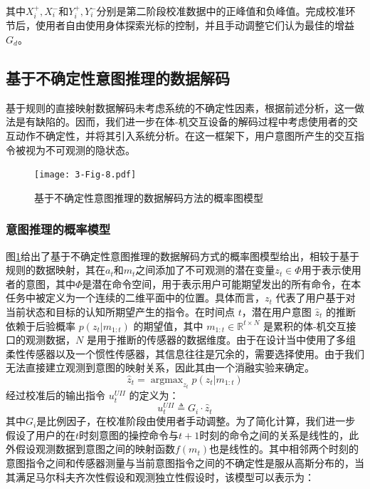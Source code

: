 其中$X_i^ + ,X_i^ - $和$Y_i^ + ,Y_i^ - $分别是第二阶段校准数据中的正峰值和负峰值。完成校准环节后，使用者自由使用身体探索光标的控制，并且手动调整它们认为最佳的增益$G_d$。 

\subsection{基于不确定性意图推理的数据解码}基于规则的直接映射数据解码未考虑系统的不确定性因素，根据前述分析，这一做法是有缺陷的。因而，我们进一步在体-机交互设备的解码过程中考虑使用者的交互动作不确定性，并将其引入系统分析。在这一框架下，用户意图所产生的交互指令被视为不可观测的隐状态。

\begin{figure}[htb]
    \centering
    \texttt{[image: 3-Fig-8.pdf]}
    \caption{基于不确定性意图推理的数据解码方法的概率图模型}
    \label{3-fig-8}
\end{figure} 

\subsubsection{意图推理的概率模型}
图\ref{3-fig-8}给出了基于不确定性意图推理的数据解码方式的概率图模型给出，相较于基于规则的数据映射，其在${a_t}$和${m_t}$之间添加了不可观测的潜在变量${z_t} \in \Phi $用于表示使用者的意图，其中$\Phi$是潜在命令空间，用于表示用户可能期望发出的所有命令，在本任务中被定义为一个连续的二维平面中的位置。具体而言，${z_t}$ 代表了用户基于对当前状态和目标的认知所期望产生的指令。在时间点 $t$，潜在用户意图 ${\hat z_t}$ 的推断依赖于后验概率 $p({z_t}|{m_{1:t}})$ 的期望值，其中 $m_{1:t} \in {\mathbb{R}^{t \times N}}$ 是累积的体-机交互接口的观测数据，$N$ 是用于推断的传感器的数据维度。由于在设计当中使用了多组柔性传感器以及一个惯性传感器，其信息往往是冗余的，需要选择使用。由于我们无法直接建立观测到意图的映射关系，因此其由一个消融实验来确定。
\begin{equation}
    \label{eq5}
    \hat z_t = \mathop{argmax}_{z_t} p({z_t}|{m_{1:t}})
\end{equation}
经过校准后的输出指令 $u_t^{UII}$ 的定义为：
\begin{equation}
\label{eq6}
u_t^{UII} \triangleq {G_i} \cdot {\hat z_t}
\end{equation}    
其中$G_i$是比例因子，在校准阶段由使用者手动调整。为了简化计算，我们进一步假设了用户的在$t$时刻意图的操控命令与$t+1$时刻的命令之间的关系是线性的，此外假设观测数据到意图之间的映射函数$f(m_t)$也是线性的。其中相邻两个时刻的意图指令之间和传感器测量与当前意图指令之间的不确定性是服从高斯分布的，当其满足马尔科夫齐次性假设和观测独立性假设时，该模型可以表示为：

